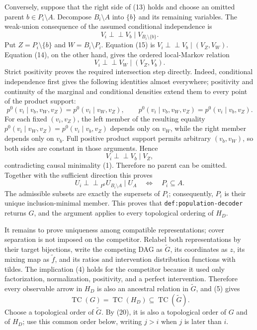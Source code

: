 Conversely, suppose that the right side of (13) holds and choose an omitted parent \(b\in P_i\setminus A\).  Decompose \(B_i\setminus A\) into \(\{b\}\) and its remaining variables.  The weak-union consequence of the assumed conditional independence is
\[
 V_i\mathbin{\perp\!\!\!\perp}V_b
 \mid V_{B_i\setminus\{b\}}.
\tag{15}
\]
Put \(Z=P_i\setminus\{b\}\) and \(W=B_i\setminus P_i\).  Equation (15) is \(V_i\mathbin{\perp\!\!\!\perp}V_b\mid(V_Z,V_W)\).  Equation (14), on the other hand, gives the ordered local-Markov relation
\[
 V_i\mathbin{\perp\!\!\!\perp}V_W\mid(V_Z,V_b).
\tag{16}
\]
Strict positivity proves the required intersection step directly.  Indeed, conditional independence first gives the following identities almost everywhere; positivity and continuity of the marginal and conditional densities extend them to every point of the product support:
\[
 p^0(v_i\mid v_b,v_W,v_Z)=p^0(v_i\mid v_W,v_Z),
 \qquad
 p^0(v_i\mid v_b,v_W,v_Z)=p^0(v_i\mid v_b,v_Z).
\tag{17}
\]
For each fixed \((v_i,v_Z)\), the left member of the resulting equality \(p^0(v_i\mid v_W,v_Z)=p^0(v_i\mid v_b,v_Z)\) depends only on \(v_W\), while the right member depends only on \(v_b\).  Full positive product support permits arbitrary \((v_b,v_W)\), so both sides are constant in those arguments.  Hence
\[
 V_i\mathbin{\perp\!\!\!\perp}V_b\mid V_Z,
\tag{18}
\]
contradicting causal minimality (1).  Therefore no parent can be omitted.  Together with the sufficient direction this proves
\[
 U_i\mathbin{\perp\!\!\!\perp}_{P^0}U_{B_i\setminus A}\mid U_A
 \quad\Longleftrightarrow\quad P_i\subseteq A.
\tag{19}
\]
The admissible subsets are exactly the supersets of \(P_i\); consequently, \(P_i\) is their unique inclusion-minimal member.  This proves that \texttt{def:population-decoder} returns \(G\), and the argument applies to every topological ordering of \(H_D\).

It remains to prove uniqueness among compatible representations; cover separation is not imposed on the competitor.  Relabel both representations by their target bijections, write the competing DAG as \(\widetilde G\), its coordinates as \(z\), its mixing map as \(\widetilde f\), and its ratios and intervention distribution functions with tildes.  The implication (4) holds for the competitor because it used only factorization, normalization, positivity, and a perfect intervention.  Therefore every observable arrow in \(H_D\) is also an ancestral relation in \(\widetilde G\), and (5) gives
\[
 \operatorname{TC}(G)=\operatorname{TC}(H_D)
 \subseteq\operatorname{TC}(\widetilde G).
\tag{20}
\]
Choose a topological order of \(\widetilde G\).  By (20), it is also a topological order of \(G\) and of \(H_D\); use this common order below, writing \(j>i\) when \(j\) is later than \(i\).

